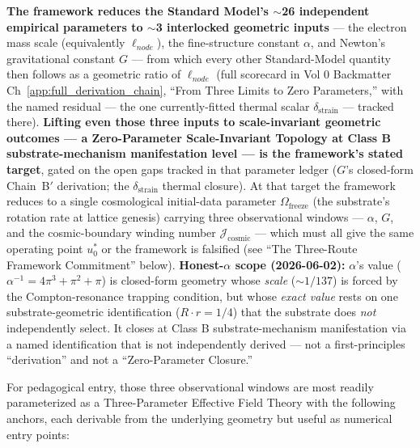 \vspace{1em}
\noindent \textbf{The framework reduces the Standard Model's $\sim$26 independent empirical parameters to $\sim$3 interlocked geometric inputs} --- the electron mass scale (equivalently $\ell_{node}$), the fine-structure constant $\alpha$, and Newton's gravitational constant $G$ --- from which every other Standard-Model quantity then follows as a geometric ratio of $\ell_{node}$ (full scorecard in Vol 0 Backmatter Ch~\ref{app:full_derivation_chain}, ``From Three Limits to Zero Parameters,'' with the named residual --- the one currently-fitted thermal scalar $\delta_{\text{strain}}$ --- tracked there). \textbf{Lifting even those three inputs to scale-invariant geometric outcomes --- a Zero-Parameter Scale-Invariant Topology at Class B substrate-mechanism manifestation level --- is the framework's stated target}, gated on the open gaps tracked in that parameter ledger ($G$'s closed-form Chain~B$'$ derivation; the $\delta_{\text{strain}}$ thermal closure). At that target the framework reduces to a single cosmological initial-data parameter $\Omega_{\text{freeze}}$ (the substrate's rotation rate at lattice genesis) carrying three observational windows --- $\alpha$, $G$, and the cosmic-boundary winding number $\mathcal{J}_{\text{cosmic}}$ --- which must all give the same operating point $u_0^*$ or the framework is falsified (see ``The Three-Route Framework Commitment'' below). \textbf{Honest-$\alpha$ scope (2026-06-02):} $\alpha$'s value ($\alpha^{-1} = 4\pi^3 + \pi^2 + \pi$) is closed-form geometry whose \emph{scale} ($\sim 1/137$) is forced by the Compton-resonance trapping condition, but whose \emph{exact value} rests on one substrate-geometric identification ($R \cdot r = 1/4$) that the substrate does \emph{not} independently select. It closes at Class B substrate-mechanism manifestation via a named identification that is not independently derived --- not a first-principles ``derivation'' and not a ``Zero-Parameter Closure.''

\noindent For pedagogical entry, those three observational windows are most readily parameterized as a Three-Parameter Effective Field Theory with the following anchors, each derivable from the underlying geometry but useful as numerical entry points:

